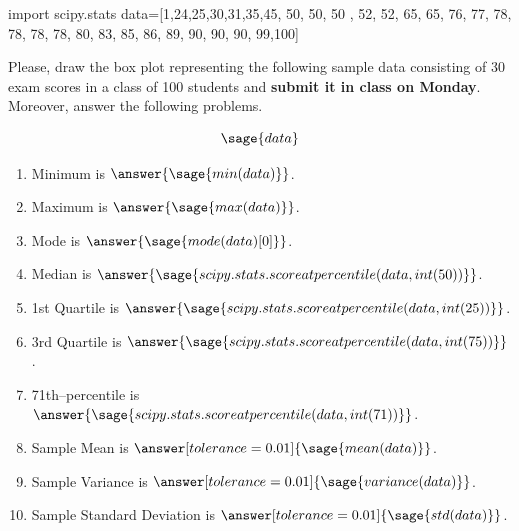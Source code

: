 \documentclass{ximera}
\begin{document}
\begin{problem}
\begin{sagesilent}
import scipy.stats
data=[1,24,25,30,31,35,45, 50, 50, 50 , 52, 52, 65, 65, 76, 77, 78, 78, 78, 78, 80, 83, 85, 86, 89, 90, 90, 90, 99,100]
\end{sagesilent}
Please, draw the box plot representing the following sample data consisting of 30 exam scores in a class of 100 students and \textbf{submit it in class on Monday}. Moreover, answer the following problems.

$$\sage{data}$$

\begin{enumerate}
    \item Minimum is $\answer{\sage{min(data)}}$.
    \item Maximum is $\answer{\sage{max(data)}}$.
    \item Mode is $\answer{\sage{mode(data)[0]}}$.
    \item Median is $\answer{\sage{scipy.stats.scoreatpercentile(data,int(50))}}$.
    \item 1st Quartile is $\answer{\sage{scipy.stats.scoreatpercentile(data,int(25))}}$.
    \item 3rd Quartile is $\answer{\sage{scipy.stats.scoreatpercentile(data,int(75))}}$.
    \item 71th--percentile is $\answer{\sage{scipy.stats.scoreatpercentile(data,int(71))}}$.
    \item Sample Mean is $\answer[tolerance=0.01]{\sage{mean(data)}}$.
    \item Sample Variance is $\answer[tolerance=0.01]{\sage{variance(data)}}$.
    \item Sample Standard Deviation is $\answer[tolerance=0.01]{\sage{std(data)}}$.
\end{enumerate}
\end{problem}
\end{document}
